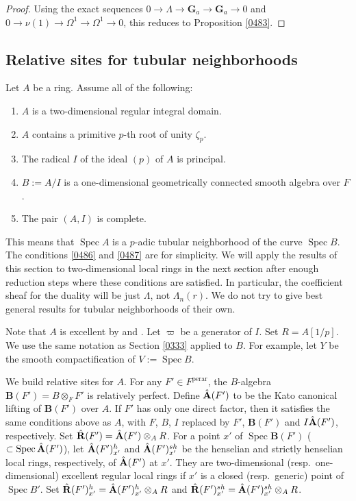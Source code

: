 \documentclass{amsart}
\theoremstyle{remark}
\numberwithin{equation}{subsection}
\newcommand{\tensor}{\mathbin{\otimes}}
\newcommand{\Ga}{\mathbf{G}_{a}}
\newcommand{\perar}{\mathrm{perar}}
\newcommand{\alg}[1]{\mathbf{#1}}
\DeclareMathOperator{\Spec}{Spec}
\begin{document}
\begin{proof}
	Using the exact sequences
	$0 \to \Lambda \to \Ga \to \Ga \to 0$
	and $0 \to \nu(1) \to \Omega^{1} \to \Omega^{1} \to 0$,
	this reduces to Proposition \ref{0483}.
\end{proof}


\subsection{Relative sites for tubular neighborhoods}
\label{0340}

Let $A$ be a ring.
Assume all of the following:
\begin{enumerate}
	\item \label{0485}
		$A$ is a two-dimensional regular integral domain.
	\item \label{0486}
		$A$ contains a primitive $p$-th root of unity $\zeta_{p}$.
	\item \label{0487}
		The radical $I$ of the ideal $(p)$ of $A$ is principal.
	\item \label{0488}
		$B := A / I$ is a one-dimensional geometrically connected smooth algebra over $F$.
	\item \label{0489}
		The pair $(A, I)$ is complete.
\end{enumerate}
This means that $\Spec A$ is a $p$-adic tubular neighborhood of the curve $\Spec B$.
The conditions \eqref{0486} and \eqref{0487} are for simplicity.
We will apply the results of this section to two-dimensional local rings in the next section
after enough reduction steps where these conditions are satisfied.
In particular, the coefficient sheaf for the duality will be just $\Lambda$, not $\Lambda_{n}(r)$.
We do not try to give best general results for tubular neighborhoods of their own.

Note that $A$ is excellent by \cite[Proposition 2.3]{Gre82} and \cite[Main Theorem 1]{KS21}.
Let $\varpi$ be a generator of $I$.
Set $R = A[1 / p]$.
We use the same notation as Section \ref{0333}
applied to $B$.
For example, let $Y$ be the smooth compactification of $V := \Spec B$.

We build relative sites for $A$.
For any $F' \in F^{\perar}$,
the $B$-algebra $\alg{B}(F') = B \tensor_{F} F'$ is relatively perfect.
Define $\Hat{\alg{A}}(F')$ to be the Kato canonical lifting of $\alg{B}(F')$ over $A$.
If $F'$ has only one direct factor,
then it satisfies the same conditions above as $A$,
with $F$, $B$, $I$ replaced by $F'$, $\alg{B}(F')$ and $I \Hat{\alg{A}}(F')$, respectively.
Set $\Hat{\alg{R}}(F') = \Hat{\alg{A}}(F') \tensor_{A} R$.
For a point $x'$ of $\Spec \alg{B}(F')$ ($\subset \Spec \Hat{\alg{A}}(F')$),
let $\Hat{\alg{A}}(F')_{x'}^{h}$ and $\Hat{\alg{A}}(F')_{x'}^{sh}$ be
the henselian and strictly henselian local rings, respectively, of $\Hat{\alg{A}}(F')$ at $x'$.
They are two-dimensional (resp.\ one-dimensional) excellent regular local rings
if $x'$ is a closed (resp.\ generic) point of $\Spec B'$.
Set $\Hat{\alg{R}}(F')_{x'}^{h} = \Hat{\alg{A}}(F')_{x'}^{h} \tensor_{A} R$
and $\Hat{\alg{R}}(F')_{x'}^{sh} = \Hat{\alg{A}}(F')_{x'}^{sh} \tensor_{A} R$.
\end{document}
